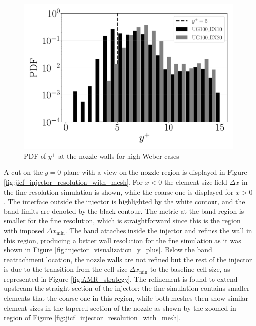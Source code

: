 \begin{figure}[ht]
	\centering
   \includegraphics[scale=0.20]{./part2_developments/figures_ch5_resolved_JICF/instabilities_resolution/y_plus_injector}
   \vspace{-0.15in}
   \caption{PDF of $y^+$ at the nozzle walls for high Weber cases}
   \label{fig:jicf_nozzle_y_plus_PDF}
\end{figure}



A cut on the $y = 0$ plane with a view on the nozzle region is displayed in Figure \ref{fig:jicf_injector_resolution_with_mesh}.  For $x < 0$ the element size field $\Delta x$ in the fine resolution simulation is shown, while the coarse one is displayed for $x > 0$. The interface outside the injector is highlighted by the white contour, and the band limits are denoted by the black contour. The metric at the band region is smaller for the fine resolution, which is straightforward since this is the region with imposed $\Delta x_\mathrm{min}$. The band attaches inside the injector and refines the wall in this region, producing a better wall resolution for the fine simulation as it was shown in Figure \ref{fig:injector_visualization_y_plus}. Below the band reattachment location, the nozzle walls are not refined but the rest of the injector is due to the transition from the cell size $\Delta x_\mathrm{min}$ to the baseline cell size, as represented in Figure \ref{fig:AMR_strategy}. The refinement is found to extend upstream the straight section of the injector: the fine simulation contains smaller elements that the coarse one in this region, while both meshes then show similar element sizes in the tapered section of the nozzle as shown by the zoomed-in region of Figure \ref{fig:jicf_injector_resolution_with_mesh}.

